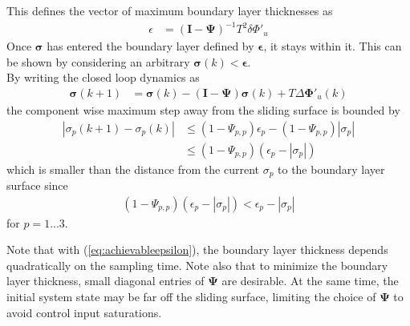 \documentclass{ifacconf}
\providecommand{\mbf}[1]{\mathbf{#1}}
\newcommand{\idxSample}{{\ensuremath{k}}}
\newcommand{\idxAxis}{{\ensuremath{p}}}
\begin{document}
This defines the vector of maximum boundary layer thicknesses as
\begin{align}
\epsilon &=
(\mbf{I} - \mbf{\Psi})^{-1} T^2 \delta \Phi'_u
\label{eq:achievableepsilon}
\end{align}
Once $\mbf{\sigma}$ has entered the boundary layer defined by $\mbf{\epsilon}$, it stays within it. This can be shown by considering an arbitrary $\mbf{\sigma}(k) < \mbf{\epsilon}$.\\ 
By writing the closed loop dynamics as
\begin{align}
\mbf{\sigma}(\idxSample+1) &= 
\mbf{\sigma}
(
\idxSample) -
(\mbf{I} - \mbf{\Psi}) 
\mbf{\sigma}(k)
+
T \Delta \mbf{\Phi}'_u(\idxSample)
\end{align}
the component wise maximum step away from the sliding surface is bounded by
\begin{align}
|{\sigma}_\idxAxis(\idxSample+1) - {\sigma}_\idxAxis(\idxSample)|
&\leq (1-\Psi_{\idxAxis, \idxAxis})\epsilon_\idxAxis - (1-\Psi_{\idxAxis, \idxAxis})|\sigma_\idxAxis| \\
&\leq (1-\Psi_{\idxAxis, \idxAxis})(\epsilon_\idxAxis - |\sigma_\idxAxis|)
\end{align}
which is smaller than the distance from the current ${\sigma_\idxAxis}$ to the boundary layer surface since
\begin{align}
(1-\Psi_{\idxAxis, \idxAxis})(\epsilon_\idxAxis - |\sigma_\idxAxis|) < \epsilon_\idxAxis - |\sigma_\idxAxis|
\end{align}
for $\idxAxis = 1...3$.

Note that with (\ref{eq:achievableepsilon}), the boundary layer thickness depends quadratically on the sampling time. Note also that to minimize the boundary layer thickness, small diagonal entries of $\mbf{\Psi}$ are desirable. At the same time, the initial system state may be far off the sliding surface, limiting the choice of $\mbf{\Psi}$ to avoid control input saturations. 
\end{document}
